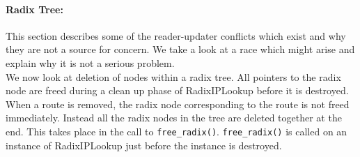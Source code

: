 \documentclass[a4paper,marginparwidth=50pt,marginparsep=10pt]{article}
\begin{document}
\paragraph{Radix Tree:}
This section describes some of the reader-updater conflicts which exist and why they are not a source for concern. We take a look at a race which might arise and explain why it is not a serious problem.\\

We now look at deletion of nodes within a radix tree. All pointers to the radix node are freed during a clean up phase of RadixIPLookup before it is destroyed. When a route is removed, the radix node corresponding to the route is not freed immediately. Instead all the radix nodes in the tree are deleted together at the end. This takes place in the call to \verb+free_radix()+. \verb+free_radix()+ is called on an instance of RadixIPLookup just before the instance is destroyed.\\
\end{document}

